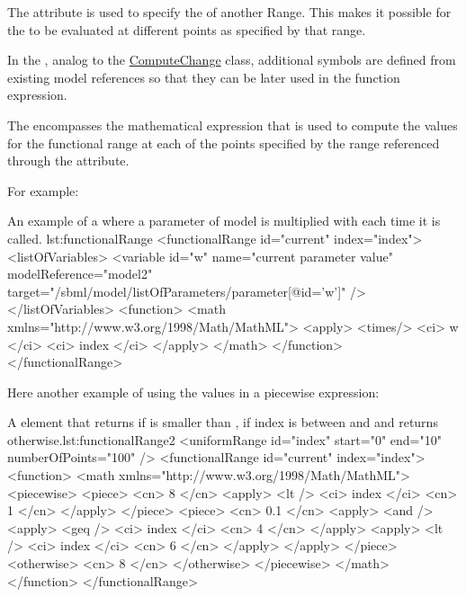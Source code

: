 The attribute  is used to specify the  of another Range. This makes it possible for the  to be evaluated at different points as specified by that range. 

In the , analog to the \hyperref[class:computeChange]{ComputeChange} class,  additional symbols are defined from existing model references so that they can be later used in the function expression. 

The  encompasses the mathematical expression that is used to compute the values for the functional range at each of the points specified by the range referenced through the  attribute. 

For example:

\begin{myXmlLst}{An example of a  where a parameter  of model  is multiplied with  each time it is called. }{lst:functionalRange}
    <functionalRange id="current" index="index"> 
      <listOfVariables> 
         <variable id="w" name="current parameter value"   
				                  modelReference="model2"
                          target="/sbml/model/listOfParameters/parameter[@id='w']" /> 
      </listOfVariables> 
      <function>
        <math xmlns="http://www.w3.org/1998/Math/MathML"> 
           <apply>
           <times/>
           <ci> w </ci> 
           <ci> index </ci> 
           </apply>
        </math>  
      </function>
    </functionalRange> 
\end{myXmlLst}

Here another example of using the values in a piecewise expression: 

\begin{myXmlLst}{A  element that returns  if 
   is smaller than ,  if index is between 
	 and  and returns  otherwise.}{lst:functionalRange2}
        <uniformRange id="index" start="0" end="10" numberOfPoints="100" />
        <functionalRange id="current" index="index">
          <function>
            <math xmlns="http://www.w3.org/1998/Math/MathML">
              <piecewise>
                <piece>
                  <cn> 8 </cn>
                  <apply>
                    <lt />
                    <ci> index </ci>
                    <cn> 1 </cn>
                  </apply>
                </piece>
                <piece>
                  <cn> 0.1 </cn>
                  <apply>
                    <and />
                    <apply>
                      <geq />
                      <ci> index </ci>
                      <cn> 4 </cn>
                    </apply>
                    <apply>
                      <lt />
                      <ci> index </ci>
                      <cn> 6 </cn>
                    </apply>
                  </apply>
                </piece>
                <otherwise>
                  <cn> 8 </cn>
                </otherwise>
              </piecewise>
            </math>
          </function>
        </functionalRange>
\end{myXmlLst}



